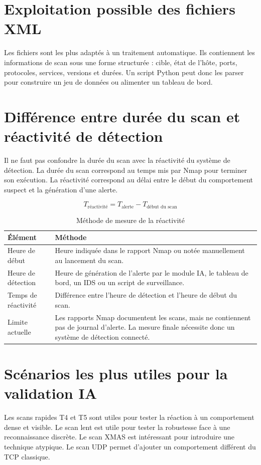 \documentclass[12pt,a4paper]{report}
\newcommand{\code}[1]{\texttt{\detokenize{#1}}}
\begin{document}
\section{Exploitation possible des fichiers XML}
Les fichiers \code{.xml} sont les plus adaptés à un traitement automatique. Ils contiennent les informations de scan sous une forme structurée : cible, état de l'hôte, ports, protocoles, services, versions et durées. Un script Python peut donc les parser pour construire un jeu de données ou alimenter un tableau de bord.

\section{Différence entre durée du scan et réactivité de détection}
Il ne faut pas confondre la durée du scan avec la réactivité du système de détection. La durée du scan correspond au temps mis par Nmap pour terminer son exécution. La réactivité correspond au délai entre le début du comportement suspect et la génération d'une alerte.

\[
T_{\text{réactivité}} = T_{\text{alerte}} - T_{\text{début du scan}}
\]

\begin{table}[H]
\centering
\caption{Méthode de mesure de la réactivité}
\label{tab:reactivite}
\begin{tabularx}{\textwidth}{L{4cm}Y}
\toprule
{}
\color{white}\textbf{Élément} & \color{white}\textbf{Méthode} \\
\midrule
Heure de début & Heure indiquée dans le rapport Nmap ou notée manuellement au lancement du scan. \\
Heure de détection & Heure de génération de l'alerte par le module IA, le tableau de bord, un IDS ou un script de surveillance. \\
Temps de réactivité & Différence entre l'heure de détection et l'heure de début du scan. \\
Limite actuelle & Les rapports Nmap documentent les scans, mais ne contiennent pas de journal d'alerte. La mesure finale nécessite donc un système de détection connecté. \\
\bottomrule
\end{tabularx}
\end{table}

\section{Scénarios les plus utiles pour la validation IA}
Les scans rapides T4 et T5 sont utiles pour tester la réaction à un comportement dense et visible. Le scan lent est utile pour tester la robustesse face à une reconnaissance discrète. Le scan XMAS est intéressant pour introduire une technique atypique. Le scan UDP permet d'ajouter un comportement différent du TCP classique.
\end{document}
